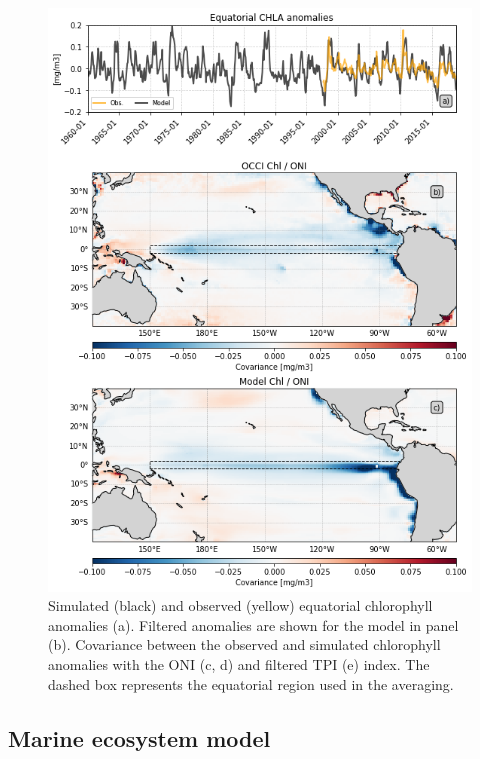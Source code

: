 \begin{figure}[htp]
	\centering
	\includegraphics[scale=0.4]{figs/fig2.png}
	\caption{Simulated (black) and observed (yellow) equatorial chlorophyll anomalies (a). Filtered anomalies are shown for the model in panel (b). Covariance between the observed and simulated chlorophyll anomalies with the ONI (c, d) and filtered TPI (e) index. The dashed box represents the equatorial region used in the averaging.}
	\label{fig:nemo-sat-chl}
\end{figure}

\subsection{Marine ecosystem model}

